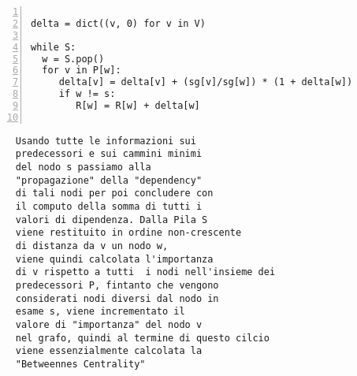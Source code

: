 \begin{minipage}{0.49\linewidth}
	\begin{Verbatim}[frame=topline,numbers=left,label=Codice,framesep=3mm]
	
delta = dict((v, 0) for v in V)
	
while S:
  w = S.pop()
  for v in P[w]:
     delta[v] = delta[v] + (sg[v]/sg[w]) * (1 + delta[w])
     if w != s:
        R[w] = R[w] + delta[w]
        
	\end{Verbatim}
\end{minipage}\hfill
\begin{minipage}{0.49\linewidth}
	\begin{Verbatim}
	 Usando tutte le informazioni sui 
	 predecessori e sui cammini minimi 
	 del nodo s passiamo alla 
	 "propagazione" della "dependency" 
	 di tali nodi per poi concludere con 
	 il computo della somma di tutti i 
	 valori di dipendenza. Dalla Pila S 
	 viene restituito in ordine non-crescente
	 di distanza da v un nodo w, 
	 viene quindi calcolata l'importanza
	 di v rispetto a tutti  i nodi nell'insieme dei
	 predecessori P, fintanto che vengono 
	 considerati nodi diversi dal nodo in
	 esame s, viene incrementato il 
	 valore di "importanza" del nodo v 
	 nel grafo, quindi al termine di questo cilcio
	 viene essenzialmente calcolata la
	 "Betweennes Centrality"
	\end{Verbatim}
\end{minipage}
 \newline\newline